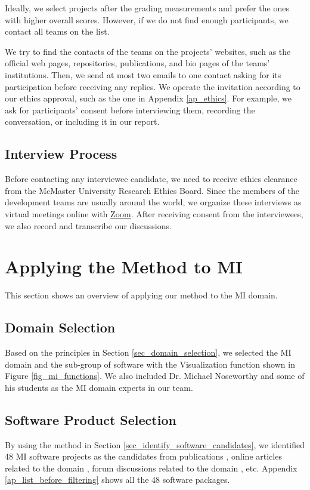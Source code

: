 Ideally, we select projects after the grading measurements and prefer the ones with higher overall scores. However, if we do not find enough participants, we contact all teams on the list.

We try to find the contacts of the teams on the projects' websites, such as the official web pages, repositories, publications, and bio pages of the teams' institutions. Then, we send at most two emails to one contact asking for its participation before receiving any replies. We operate the invitation according to our ethics approval, such as the one in Appendix \ref{ap_ethics}. For example, we ask for participants' consent before interviewing them, recording the conversation, or including it in our report.

\subsection{Interview Process}
\label{sec_interview_process}
Before contacting any interviewee candidate, we need to receive ethics clearance from the McMaster University Research Ethics Board. Since the members of the development teams are usually around the world, we organize these interviews as virtual meetings online with \hyperlink{https://zoom.us/}{Zoom}. After receiving consent from the interviewees, we also record and transcribe our discussions.

\section{Applying the Method to MI}
\label{sec_applying_method}
This section shows an overview of applying our method to the MI domain.

\subsection{Domain Selection}
Based on the principles in Section \ref{sec_domain_selection}, we selected the MI domain and the sub-group of software with the Visualization function shown in Figure \ref{fig_mi_functions}. We also included Dr. Michael Noseworthy and some of his students as the MI domain experts in our team.

\subsection{Software Product Selection}
\label{sec_mi_software_selection}
By using the method in Section \ref{sec_identify_software_candidates}, we identified 48 MI software projects as the candidates from publications \cite{Bjorn2017} \cite{Bruhschwein2019} \cite{Haak2015}, online articles related to the domain \cite{Emms2019} \cite{Hasan2020} \cite{Mu2019}, forum discussions related to the domain \cite{Samala2014}, etc. Appendix \ref{ap_list_before_filtering} shows all the 48 software packages.

